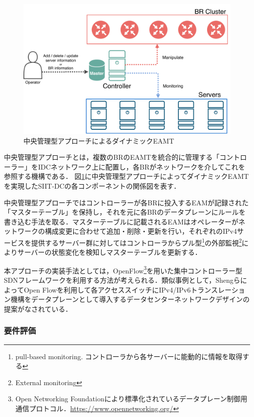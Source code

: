 \begin{figure}[h]
    \begin{center}
      \includegraphics[width=12cm,pagebox=cropbox,clip]{img/approach_centerized_model.pdf}
    \end{center}
    \caption{中央管理型アプローチによるダイナミックEAMT}
    \label{fig:approach_centerized_model}
\end{figure}

中央管理型アプローチとは，複数のBRのEAMTを統合的に管理する「コントローラー」をIDCネットワーク上に配置し，各BRがネットワークを介してこれを参照する機構である．
図\ref{fig:approach_centerized_model}に中央管理型アプローチによってダイナミックEAMTを実現したSIIT-DCの各コンポーネントの関係図を表す．

中央管理型アプローチではコントローラーが各BRに投入するEAMが記録された「マスターテーブル」を保持し，それを元に各BRのデータプレーンにルールを書き込む手法を取る．マスターテーブルに記載されるEAMはオペレーターがネットワークの構成変更に合わせて追加・削除・更新を行い，それぞれのIPv4サービスを提供するサーバー群に対してはコントローラからプル型\footnote{pull-based monitoring. コントローラから各サーバーに能動的に情報を取得する}の外部監視\footnote{External monitoring}によりサーバーの状態変化を検知しマスターテーブルを更新する．

本アプローチの実装手法としては，OpenFlow\footnote{Open Networking Foundationにより標準化されているデータプレーン制御用通信プロトコル．\url{https://www.opennetworking.org/}}を用いた集中コントローラー型SDNフレームワークを利用する方法が考えられる\cite{RFC7426}．類似事例として，ShengらによってOpen Flowを利用して各アクセススイッチにIPv4/IPv6トランスレーション機構をデータプレーンとして導入するデータセンターネットワークデザインの提案がなされている\cite{7560347}．


\subsubsection{要件評価}

